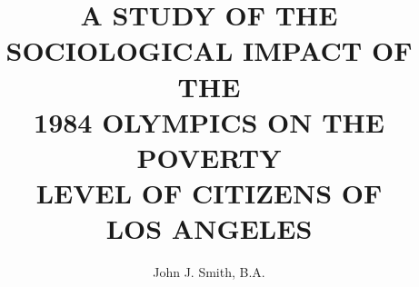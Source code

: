 \documentclass[10pt]{mugsthesis} %
\title{ %
  A STUDY OF THE SOCIOLOGICAL IMPACT OF THE\\
  1984 OLYMPICS ON THE POVERTY\\
  LEVEL OF CITIZENS OF\\
  LOS ANGELES
} %
\author{John J. Smith, B.A.} %
\begin{document}
\maketitle                %

\frontmatter

\tableofcontents          %
\listoftables             %
\listoffigures            %

\mainmatter


\nocite{*} %


\appendix

\end{document}

